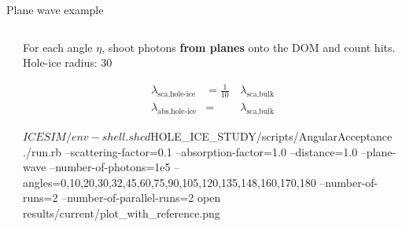 
\begin{frame}[fragile]{Plane wave example}

  \begin{columns}
    \begin{column}{0.5\textwidth}
    \end{column}
    \begin{column}{0.5\textwidth}

      For each angle $\eta$, shoot photons \textbf{from planes} onto the DOM and count hits.
      \small{Hole-ice radius: 30\cm}

      \begin{equation*}\begin{align}
        \lambda_\text{sca,hole-ice} &= \frac{1}{10}\, & \lambda_\text{sca,bulk} \\
        \lambda_\text{abs,hole-ice} &= & \lambda_\text{sca,bulk}
      \end{align}\end{equation*}

      \begin{smallbash}
        $ICESIM/env-shell.sh
        cd $HOLE_ICE_STUDY/scripts/AngularAcceptance
        ./run.rb --scattering-factor=0.1 --absorption-factor=1.0 --distance=1.0 --plane-wave --number-of-photons=1e5 --angles=0,10,20,30,32,45,60,75,90,105,120,135,148,160,170,180 --number-of-runs=2 --number-of-parallel-runs=2
        open results/current/plot_with_reference.png
      \end{smallbash}

    \end{column}
  \end{columns}


\end{frame}

